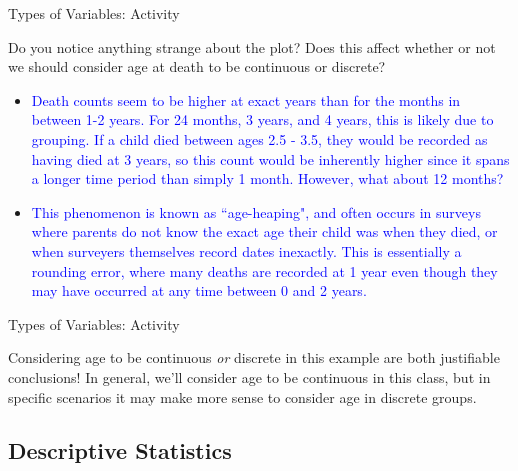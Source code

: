 \documentclass[10pt,t]{beamer}
\begin{document}
\begin{frame}{Types of Variables: Activity}

	
Do you notice anything strange about the plot? Does this affect whether or not we should consider age at death to be continuous or discrete?
	
	\vspace{0.3cm}
	
\begin{itemize}
	\item[] \small \textcolor{blue}{Death counts seem to be higher at exact years than for the months in between 1-2 years. For 24 months, 3 years, and 4 years, this is likely due to grouping. If a child died between ages 2.5 - 3.5, they would be recorded as having died at 3 years, so this count would be inherently higher since it spans a longer time period than simply 1 month. However, what about 12 months?} 
	
	\vspace{0.3cm}
	
	\item[] \small \textcolor{blue}{This phenomenon is known as ``age-heaping", and often occurs in surveys where parents do not know the exact age their child was when they died, or when surveyers themselves record dates inexactly. This is essentially a rounding error, where many deaths are recorded at 1 year even though they may have occurred at any time between 0 and 2 years. }
\end{itemize}	
	
\end{frame}

\begin{frame}{Types of Variables: Activity}


Considering age to be continuous \textit{or} discrete in this example are both justifiable conclusions! In general, we'll consider age to be continuous in this class, but in specific scenarios it may make more sense to consider age in discrete groups. 

\end{frame}

\subsection{Descriptive Statistics}
\end{document}
